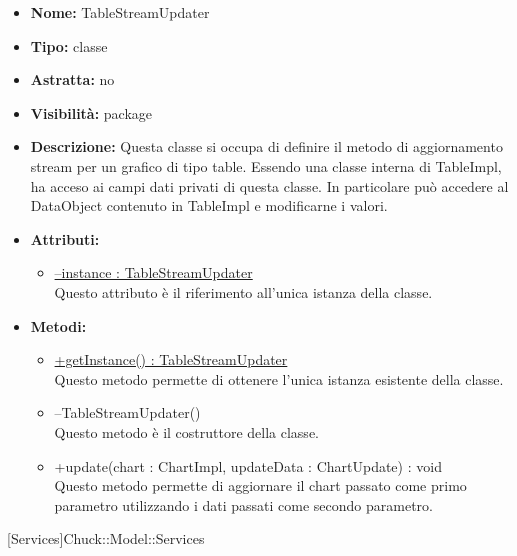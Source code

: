 			
			\begin{itemize}
			\item \textbf{Nome:} TableStreamUpdater
			\item \textbf{Tipo:} classe
			
		\item \textbf{Astratta:}
		no
			\item \textbf{Visibilità:} package
			\item \textbf{Descrizione:} Questa classe si occupa di definire il metodo di aggiornamento stream per un grafico di tipo table. Essendo una classe interna di TableImpl, ha acceso ai campi dati privati di questa classe. In particolare può accedere al DataObject contenuto in TableImpl e modificarne i valori.
			\item \textbf{Attributi:}
				\begin{itemize}
				\setlength{\itemsep}{5pt}
				
					\item[\ding{111}] \underline{--instance : TableStreamUpdater} \\ [1mm] Questo attributo è il riferimento all'unica istanza della classe.
				\end{itemize}
		
			\item \textbf{Metodi:}
				\begin{itemize}
				\setlength{\itemsep}{5pt}
				
					\item[\ding{111}] {\underline{+getInstance() : TableStreamUpdater}} \\ [1mm] Questo metodo permette di ottenere l'unica istanza esistente della classe.
					\item[\ding{111}] {{--TableStreamUpdater()}} \\ [1mm] Questo metodo è il costruttore della classe.
					\item[\ding{111}] {{+update(chart : ChartImpl, updateData : ChartUpdate) : void}} \\ [1mm] Questo metodo permette di aggiornare il chart passato come primo parametro utilizzando i dati passati come secondo parametro.
				\end{itemize}
		
			\end{itemize}

			
			[Services]{Chuck::Model::Services}
			

	

